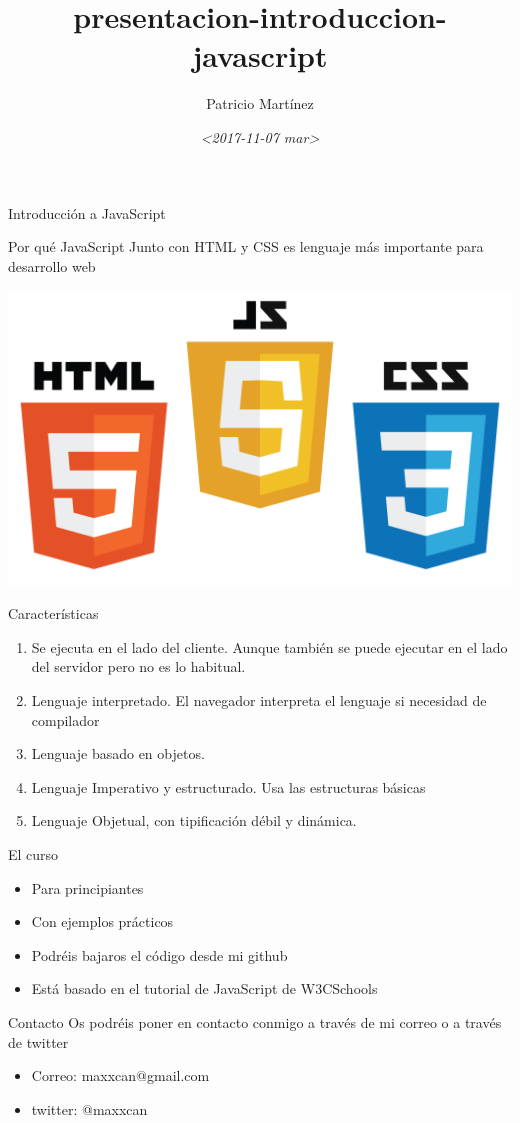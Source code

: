\documentclass[presentation]{beamer}
\author{Patricio Martínez}
\date{\textit{<2017-11-07 mar>}}
\title{presentacion-introduccion-javascript}
\begin{document}
\maketitle


\begin{frame}[label={sec:orgd428ebe}]{Introducción a JavaScript}
\begin{block}{Por qué JavaScript}
Junto con HTML y CSS es lenguaje más importante para desarrollo web

\begin{center}
\includegraphics[width=.9\linewidth]{./img/html-css-js-logos.png}
\end{center}
\end{block}
\end{frame}
\begin{frame}[label={sec:org337c04c}]{Características}
\begin{enumerate}
\item Se ejecuta en el lado del cliente. Aunque también se puede ejecutar en el lado del servidor pero no es lo habitual.
\item Lenguaje interpretado. El navegador interpreta el lenguaje si necesidad de compilador
\item Lenguaje basado en objetos.
\item Lenguaje Imperativo y estructurado. Usa las estructuras básicas
\item Lenguaje Objetual, con tipificación débil y dinámica.
\end{enumerate}
\end{frame}
\begin{frame}[label={sec:org3f69a09}]{El curso}
\begin{itemize}
\item Para principiantes
\item Con ejemplos prácticos
\item Podréis bajaros el código desde mi github
\item Está basado en el tutorial de JavaScript de W3CSchools
\end{itemize}
\end{frame}
\begin{frame}[label={sec:org6cf87c6}]{Contacto}
\alert{Os podréis poner en contacto conmigo a través de mi correo o a través de twitter}

\begin{itemize}
\item Correo: maxxcan@gmail.com
\item twitter: @maxxcan
\end{itemize}
\end{frame}
\begin{frame}[label={sec:orgfa1af5d}]{}
\end{frame}
\end{document}
